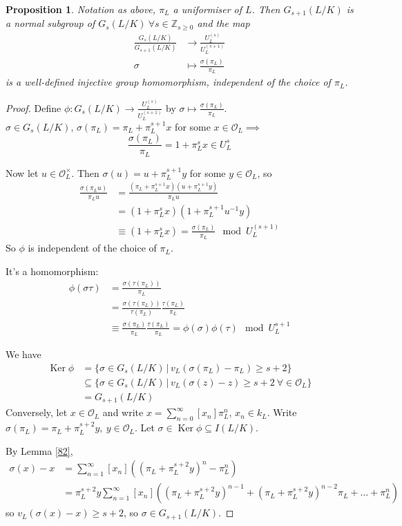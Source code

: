 \documentclass[a4paper]{article}
\newtheorem{prop}[definition]{Proposition}
\DeclareMathOperator{\Ker}{Ker}
\begin{document}
\begin{prop}
	Notation as above, $\pi_L$ a uniformiser of $L$.
	Then $G_{s+1}(L/K)$ is a normal subgroup of $G_s(L/K)\ \forall s \in \mathbb{Z}_{s \geq 0}$
	and the map
	\begin{align*}
		\frac{G_s(L/K)}{G_{s+1}(L/K)} &\to \frac{U_L^{(s)}}{U_L^{(s+1)}} \\
		\sigma &\mapsto \frac{\sigma(\pi_L)}{\pi_L}
	\end{align*}
	is a well-defined injective group homomorphism,
	independent of the choice of $\pi_L$.
\end{prop}
\begin{proof}
	Define $\phi: G_s(L/K) \to \frac{U_L^{(s)}}{U_L^{(s+1)}}$ by $\sigma \mapsto \frac{\sigma(\pi_L)}{\pi_L}$.
	$\sigma \in G_s(L/K),\, \sigma(\pi_L) = \pi_L + \pi_L^{s+1}x$ for some $x \in \mathcal{O}_L \implies$
	$$\frac{\sigma(\pi_L)}{\pi_L} = 1+\pi_L^sx \in U_L^{s}$$
	
	Now let $u \in \mathcal{O}_L^\times$.
	Then $\sigma(u) = u+\pi_L^{s+1}y$ for some $y \in \mathcal{O}_L$, so
	\begin{align*}
		\frac{\sigma(\pi_Lu)}{\pi_Lu} &= \frac{(\pi_L + \pi_L^{s+1}x)(u+\pi_L^{s+1}y)}{\pi_Lu} \\
		&= (1+\pi_L^sx)(1+\pi_L^{s+1}u^{-1}y) \\
		&\equiv (1+\pi_L^s x) = \frac{\sigma(\pi_L)}{\pi_L} \mod U_L^{(s+1)}
	\end{align*}
	So $\phi$ is independent of the choice of $\pi_L$.
	
	It's a homomorphism:
	\begin{align*}
		\phi(\sigma\tau) &= \frac{\sigma(\tau(\pi_L))}{\pi_L} \\
		&= \frac{\sigma(\tau(\pi_L))}{\tau(\pi_L)} \frac{\tau(\pi_L)}{\pi_L} \\
		&\equiv \frac{\sigma(\pi_L)}{\pi_L} \frac{\tau(\pi_L)}{\pi_L} = \phi(\sigma)\phi(\tau) \mod U_L^{s+1}
	\end{align*}
	
	We have
	\begin{align*}
		\Ker\phi &= \{\sigma \in G_s(L/K) \,|\, v_L(\sigma(\pi_L) - \pi_L) \geq s+2 \} \\
		&\subseteq \{\sigma \in G_s(L/K) \,|\, v_L(\sigma(z) - z) \geq s+2 \ \forall \in \mathcal{O}_L \}\\
		&= G_{s+1}(L/K)
	\end{align*}
	Conversely, let $x \in \mathcal{O}_L$ and write $x = \sum_{n=0}^\infty[x_n]\pi_L^n$, $x_n \in k_L$.
	Write $\sigma(\pi_L)=\pi_L + \pi_L^{s+2}y,\ y \in \mathcal{O}_L$.
	Let $\sigma \in \Ker \phi \subseteq I(L/K)$.
	
	By Lemma \ref{82},
	\begin{align*}
		\sigma(x)-x &= \sum_{n=1}^\infty[x_n]((\pi_L + \pi_L^{s+2}y)^n - \pi_L^n) \\
		&= \pi_L^{s+2}y \sum_{n=1}^\infty[x_n]((\pi_L + \pi_L^{s+2}y)^{n-1} + (\pi_L + \pi_L^{s+2}y)^{n-2}\pi_L + \dots + \pi_L^n)
	\end{align*}
	so $v_L(\sigma(x) -x) \geq s+2$, so $\sigma \in G_{s+1}(L/K)$.
\end{proof}
\end{document}
